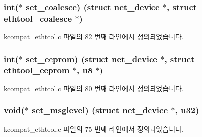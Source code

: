 \subsubsection[{\texorpdfstring{set\+\_\+coalesce}{set_coalesce}}]{\setlength{\rightskip}{0pt plus 5cm}int($\ast$ set\+\_\+coalesce) (struct net\+\_\+device $\ast$, struct {\bf ethtool\+\_\+coalesce} $\ast$)}\hypertarget{struct__kc__ethtool__ops_a86918cd34f9b78602b66a6b651c12124}{}\label{struct__kc__ethtool__ops_a86918cd34f9b78602b66a6b651c12124}


kcompat\+\_\+ethtool.\+c 파일의 82 번째 라인에서 정의되었습니다.

\subsubsection[{\texorpdfstring{set\+\_\+eeprom}{set_eeprom}}]{\setlength{\rightskip}{0pt plus 5cm}int($\ast$ set\+\_\+eeprom) (struct net\+\_\+device $\ast$, struct {\bf ethtool\+\_\+eeprom} $\ast$, {\bf u8} $\ast$)}\hypertarget{struct__kc__ethtool__ops_a6cb22a933ddb8f8ebec99311ec6ba279}{}\label{struct__kc__ethtool__ops_a6cb22a933ddb8f8ebec99311ec6ba279}


kcompat\+\_\+ethtool.\+c 파일의 80 번째 라인에서 정의되었습니다.

\subsubsection[{\texorpdfstring{set\+\_\+msglevel}{set_msglevel}}]{\setlength{\rightskip}{0pt plus 5cm}void($\ast$ set\+\_\+msglevel) (struct net\+\_\+device $\ast$, {\bf u32})}\hypertarget{struct__kc__ethtool__ops_a7cf681088e36dd7c310f5ffbcf834578}{}\label{struct__kc__ethtool__ops_a7cf681088e36dd7c310f5ffbcf834578}


kcompat\+\_\+ethtool.\+c 파일의 75 번째 라인에서 정의되었습니다.


